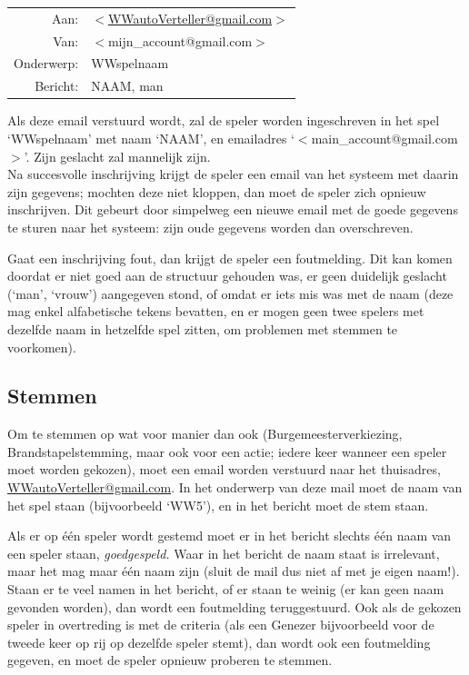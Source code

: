 \documentclass[12pt]{article}
\begin{document}
    \begin{center}
      \begin{tabularx}{0.75\textwidth}[c]{|r X|}
	\hline
	Aan: & \href{mailto:<WWautoVerteller@gmail.com>}{$<$WWautoVerteller@gmail.com$>$} \\
	Van: & $<$mijn\_account@gmail.com$>$ \\
	Onderwerp: & WWspelnaam \\[\baselineskip]	
	Bericht: & NAAM, man \\  
	\hline
      \end{tabularx}
    \end{center}
    
    Als deze email verstuurd wordt, zal de speler worden ingeschreven in het spel `WWspelnaam' met naam `NAAM', en emailadres `$<$main\_account@gmail.com$>$'. Zijn geslacht zal mannelijk zijn.
    \\[\baselineskip]
    Na succesvolle inschrijving krijgt de speler een email van het systeem met daarin zijn gegevens; mochten deze niet kloppen, dan moet de speler zich opnieuw inschrijven. Dit gebeurt door simpelweg een nieuwe email met de goede gegevens te sturen naar het systeem: zijn oude gegevens worden dan overschreven.
    
    Gaat een inschrijving fout, dan krijgt de speler een foutmelding. Dit kan komen doordat er niet goed aan de structuur gehouden was, er geen duidelijk geslacht (`man', `vrouw') aangegeven stond, of omdat er iets mis was met de naam (deze mag enkel alfabetische tekens bevatten, en er mogen geen twee spelers met dezelfde naam in hetzelfde spel zitten, om problemen met stemmen te voorkomen).

  \subsection{Stemmen}
  
    Om te stemmen op wat voor manier dan ook (Burgemeesterverkiezing, Brandstapelstemming, maar ook voor een actie; iedere keer wanneer een speler moet worden gekozen), moet een email worden verstuurd naar het thuisadres, \href{mailto:<WWautoVerteller@gmail.com>}{WWautoVerteller@gmail.com}. In het onderwerp van deze mail moet de naam van het spel staan (bijvoorbeeld `WW5'), en in het bericht moet de stem staan. 
    
    Als er op \'e\'en speler wordt gestemd moet er in het bericht slechts \'e\'en naam van een speler staan, \emph{goedgespeld.} Waar in het bericht de naam staat is irrelevant, maar het mag maar \'e\'en naam zijn (sluit de mail dus niet af met je eigen naam!). Staan er te veel namen in het bericht, of er staan te weinig (er kan geen naam gevonden worden), dan wordt een foutmelding teruggestuurd. Ook als de gekozen speler in overtreding is met de criteria (als een Genezer bijvoorbeeld voor de tweede keer op rij op dezelfde speler stemt), dan wordt ook een foutmelding gegeven, en moet de speler opnieuw proberen te stemmen.
    
\end{document}
